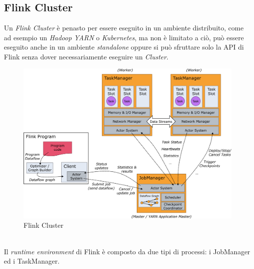 \subsection{Flink Cluster}
\label{subsec:flink_cluster}
Un \textit{Flink Cluster} è penasto per essere eseguito in un ambiente distribuito, come ad esempio un \textit{Hadoop YARN} o \textit{Kubernetes},
ma non è limitato a ciò, può essere eseguito anche in un ambiente \textit{standalone} oppure si può sfruttare solo la API di Flink senza dover necessariamente eseguire un \textit{Cluster}.
\begin{figure}[htbp]
    \centering
    \includegraphics[width=\textwidth]{images/flink/cluster.jpg}
    \caption{Flink Cluster}
    \label{fig:flink_cluster}
\end{figure}
\\Il \textit{runtime environment} di Flink è composto da due tipi di processi: i JobManager ed i TaskManager.
